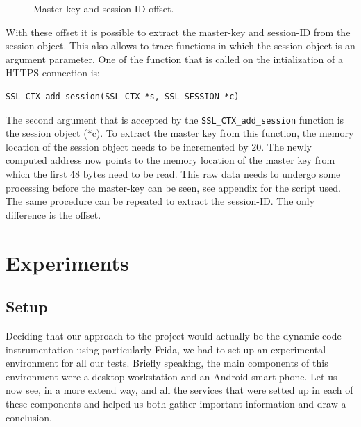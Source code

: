 \documentclass[12pt, a4paper]{report}
\begin{document}
\begin{figure}[!h]
\centering
{}
\caption{Master-key and session-ID offset.}
\end{figure}
\noindent With these offset it is possible to extract the master-key and session-ID from the session object. This also allows to trace functions in which the session object is an argument parameter. 
\newline
\newline
One of the function that is called on the intialization of a HTTPS connection is:
\begin{lstlisting}[frame=single, breaklines=true]
SSL_CTX_add_session(SSL_CTX *s, SSL_SESSION *c)
\end{lstlisting}
The second argument that is accepted by the \texttt{SSL\_CTX\_add\_session} function is the session object (*c). To extract the master key from this function, the memory location of the session object needs to be incremented by 20. The newly computed address now points to the memory location of the master key from which the first 48 bytes need to be read. This raw data needs to undergo some processing before the master-key can be seen, see appendix for the script used. The same procedure can be repeated to extract the session-ID. The only difference is the offset. 


\chapter{Experiments}
\section{Setup}

Deciding that our approach to the project would actually be the dynamic code instrumentation using particularly Frida, we had to set up an experimental environment for all our tests. Briefly speaking, the main components of this environment were a desktop workstation and an Android smart phone. Let us now see, in a more extend way, and all the services that were setted up in each of these components and helped us both gather important information and draw a conclusion.    
\end{document}
